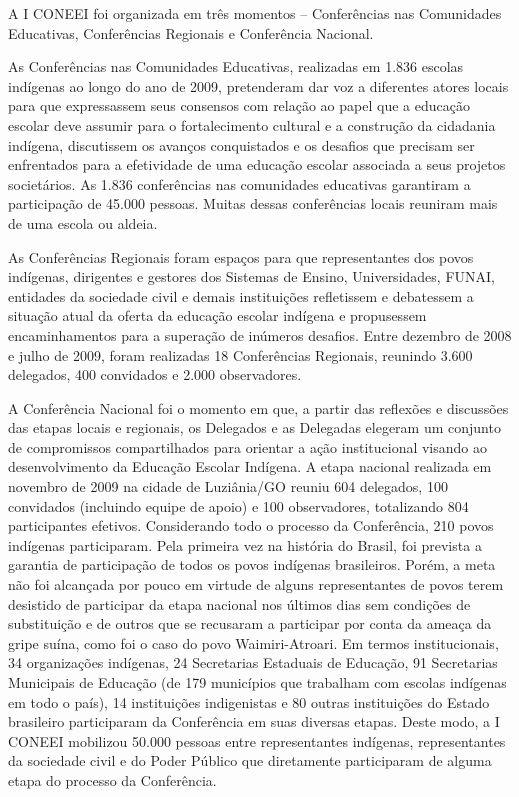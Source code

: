 \documentclass[
]{book}
\begin{document}
A I CONEEI foi organizada em três momentos -- Conferências nas Comunidades Educativas, Conferências Regionais e Conferência Nacional.

As Conferências nas Comunidades Educativas, realizadas em 1.836 escolas indígenas ao longo do ano de 2009, pretenderam dar voz a diferentes atores locais para que expressassem seus consensos com relação ao papel que a educação escolar deve assumir para o fortalecimento cultural e a construção da cidadania indígena, discutissem os avanços conquistados e os desafios que precisam ser enfrentados para a efetividade de uma educação escolar associada a seus projetos societários. As 1.836 conferências nas comunidades educativas garantiram a participação de 45.000 pessoas. Muitas dessas conferências locais reuniram mais de uma escola ou aldeia.

As Conferências Regionais foram espaços para que representantes dos povos indígenas, dirigentes e gestores dos Sistemas de Ensino, Universidades, FUNAI, entidades da sociedade civil e demais instituições refletissem e debatessem a situação atual da oferta da educação escolar indígena e propusessem encaminhamentos para a superação de inúmeros desafios. Entre dezembro de 2008 e julho de 2009, foram realizadas 18 Conferências Regionais, reunindo 3.600 delegados, 400 convidados e 2.000 observadores.

A Conferência Nacional foi o momento em que, a partir das reflexões e discussões das etapas locais e regionais, os Delegados e as Delegadas elegeram um conjunto de compromissos compartilhados para orientar a ação institucional visando ao desenvolvimento da Educação Escolar Indígena. A etapa nacional realizada em novembro de 2009 na cidade de Luziânia/GO reuniu 604 delegados, 100 convidados (incluindo equipe de apoio) e 100 observadores, totalizando 804 participantes efetivos. Considerando todo o processo da Conferência, 210 povos indígenas participaram. Pela primeira vez na história do Brasil, foi prevista a garantia de participação de todos os povos indígenas brasileiros. Porém, a meta não foi alcançada por pouco em virtude de alguns representantes de povos terem desistido de participar da etapa nacional nos últimos dias sem condições de substituição e de outros que se recusaram a participar por conta da ameaça da gripe suína, como foi o caso do povo Waimiri-Atroari. Em termos institucionais, 34 organizações indígenas, 24 Secretarias Estaduais de Educação, 91 Secretarias Municipais de Educação (de 179 municípios que trabalham com escolas indígenas em todo o país), 14 instituições indigenistas e 80 outras instituições do Estado brasileiro participaram da Conferência em suas diversas etapas. Deste modo, a I CONEEI mobilizou 50.000 pessoas entre representantes indígenas, representantes da sociedade civil e do Poder Público que diretamente participaram de alguma etapa do processo da Conferência.
\end{document}
